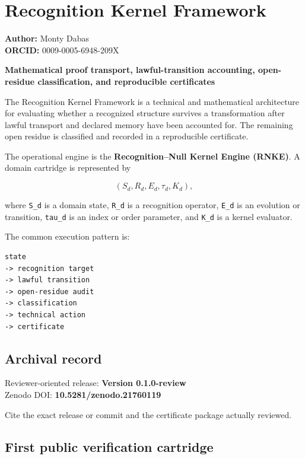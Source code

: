 \hypertarget{recognition-kernel-framework}{%
\chapter{Recognition Kernel Framework}\label{recognition-kernel-framework}}

\href{https://doi.org/10.5281/zenodo.21760119}{}

\textbf{Author:} Monty Dabas\\
\textbf{ORCID:} 0009-0005-6948-209X

\textbf{Mathematical proof transport, lawful-transition accounting, open-residue classification, and reproducible certificates}

The Recognition Kernel Framework is a technical and mathematical architecture for evaluating whether a recognized structure survives a transformation after lawful transport and declared memory have been accounted for. The remaining open residue is classified and recorded in a reproducible certificate.

The operational engine is the \textbf{Recognition--Null Kernel Engine (RNKE)}. A domain cartridge is represented by

\[
(S_d,R_d,E_d,\tau_d,K_d),
\]

where \texttt{S\_d} is a domain state, \texttt{R\_d} is a recognition operator, \texttt{E\_d} is an evolution or transition, \texttt{tau\_d} is an index or order parameter, and \texttt{K\_d} is a kernel evaluator.

The common execution pattern is:

\begin{verbatim}
state
-> recognition target
-> lawful transition
-> open-residue audit
-> classification
-> technical action
-> certificate
\end{verbatim}

\hypertarget{archival-record}{%
\section{Archival record}\label{archival-record}}

Reviewer-oriented release: \textbf{Version 0.1.0-review}\\
Zenodo DOI: \textbf{10.5281/zenodo.21760119}

Cite the exact release or commit and the certificate package actually reviewed.

\hypertarget{first-public-verification-cartridge}{%
\section{First public verification cartridge}\label{first-public-verification-cartridge}}

